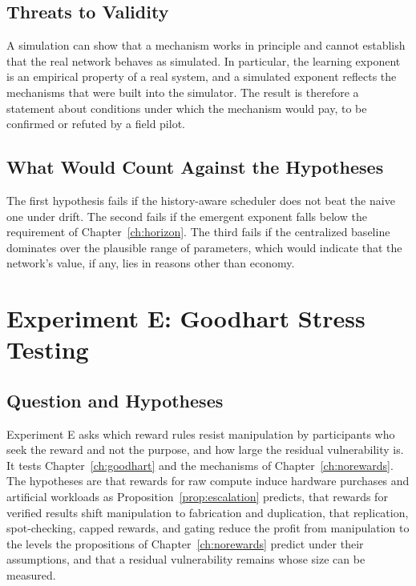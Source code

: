 \subsection*{Threats to Validity}

A simulation can show that a mechanism works in principle and cannot establish that the real network behaves as simulated. In particular, the learning exponent is an empirical property of a real system, and a simulated exponent reflects the mechanisms that were built into the simulator. The result is therefore a statement about conditions under which the mechanism would pay, to be confirmed or refuted by a field pilot.

\subsection*{What Would Count Against the Hypotheses}

The first hypothesis fails if the history-aware scheduler does not beat the naive one under drift. The second fails if the emergent exponent falls below the requirement of Chapter~\ref{ch:horizon}. The third fails if the centralized baseline dominates over the plausible range of parameters, which would indicate that the network's value, if any, lies in reasons other than economy.

\section{Experiment E: Goodhart Stress Testing}

\subsection*{Question and Hypotheses}

Experiment E asks which reward rules resist manipulation by participants who seek the reward and not the purpose, and how large the residual vulnerability is. It tests Chapter~\ref{ch:goodhart} and the mechanisms of Chapter~\ref{ch:norewards}. The hypotheses are that rewards for raw compute induce hardware purchases and artificial workloads as Proposition~\ref{prop:escalation} predicts, that rewards for verified results shift manipulation to fabrication and duplication, that replication, spot-checking, capped rewards, and gating reduce the profit from manipulation to the levels the propositions of Chapter~\ref{ch:norewards} predict under their assumptions, and that a residual vulnerability remains whose size can be measured.

